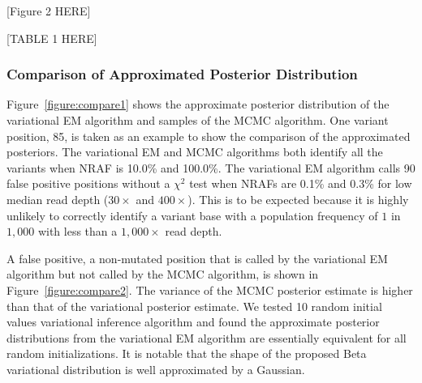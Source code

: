 \documentclass{bmcart}
\begin{document}
\vspace{2em}
\begin{center}
[Figure 2 HERE]  
\end{center}
\vspace{2em}



\vspace{2em}
\begin{center}
[TABLE 1 HERE]  
\end{center}
\vspace{2em}


\subsubsection{Comparison of Approximated Posterior Distribution}

Figure~\ref{figure:compare1} shows the approximate posterior distribution of the variational EM algorithm and samples of the MCMC algorithm.
One variant position, 85, is taken as an example to show the comparison of the approximated posteriors.
The variational EM and MCMC algorithms both identify all the variants when NRAF is 10.0\% and 100.0\%.
The variational EM algorithm calls 90 false positive positions without a $\chi^2$ test when NRAFs are 0.1\% and 0.3\% for low median read depth ($30\times$ and $400\times$).
This is to be expected because it is highly unlikely to correctly identify a variant base with a population frequency of $1$ in $1,000$ with less than a $1,000\times$ read depth.

A false positive, a non-mutated position that is called by the variational EM algorithm but not called by the MCMC algorithm, is shown in Figure~\ref{figure:compare2}.
The variance of the MCMC posterior estimate is higher than that of the variational posterior estimate.
We tested 10 random initial values variational inference algorithm and found the approximate posterior distributions from the variational EM algorithm are essentially equivalent for all random initializations.
It is notable that the shape of the proposed Beta variational distribution is well approximated by a Gaussian.

\end{document}

